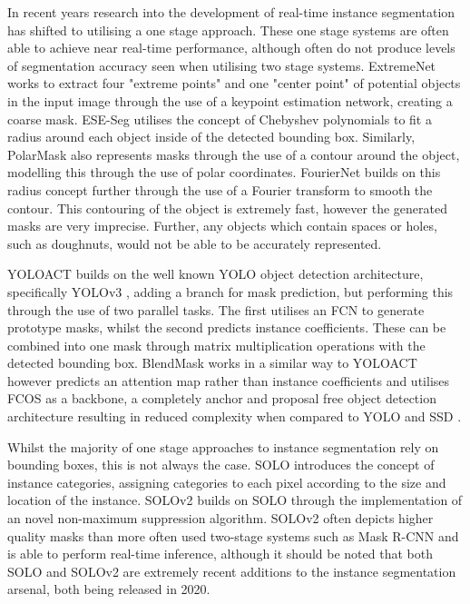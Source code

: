In recent years research into the development of real-time instance segmentation has shifted to utilising a one stage approach. These one stage systems are often able to achieve near real-time performance, although often do not produce levels of segmentation accuracy seen when utilising two stage systems. ExtremeNet \cite{zhou_bottom-up_2019} works to extract four "extreme points" and one "center point" of potential objects in the input image through the use of a keypoint estimation network, creating a coarse mask. ESE-Seg \cite{xu_explicit_2019} utilises the concept of Chebyshev polynomials to fit a radius around each object inside of the detected bounding box. Similarly, PolarMask \cite{xie_polarmask_2020} also represents masks through the use of a contour around the object, modelling this through the use of polar coordinates. FourierNet \cite{riaz_fouriernet_2020} builds on this radius concept further through the use of a Fourier transform to smooth the contour. This contouring of the object is extremely fast, however the generated masks are very imprecise. Further, any objects which contain spaces or holes, such as doughnuts, would not be able to be accurately represented. 

YOLOACT \cite{bolya_190402689_2019} builds on the well known YOLO object detection architecture, specifically YOLOv3 \cite{redmon_yolov3_2018}, adding a branch for mask prediction, but performing this through the use of two parallel tasks. The first utilises an FCN to generate prototype masks, whilst the second predicts instance coefficients. These can be combined into one mask through matrix multiplication operations with the detected bounding box. BlendMask \cite{chen_blendmask_2020} works in a similar way to YOLOACT however predicts an attention map rather than instance coefficients and utilises FCOS \cite{tian_fcos_2019} as a backbone, a completely anchor and proposal free object detection architecture resulting in reduced complexity when compared to YOLO \cite{redmon_you_2016} and SSD \cite{liu_ssd:_2016}. 

Whilst the majority of one stage approaches to instance segmentation rely on bounding boxes, this is not always the case. SOLO \cite{wang_solo_2020} introduces the concept of instance categories, assigning categories to each pixel according to the size and location of the instance. SOLOv2 \cite{wang_solov2_2020} builds on SOLO through the implementation of an novel non-maximum suppression algorithm. SOLOv2 often depicts higher quality masks than more often used two-stage systems such as Mask R-CNN and is able to perform real-time inference, although it should be noted that both SOLO and SOLOv2 are extremely recent additions to the instance segmentation arsenal, both being released in 2020. 

